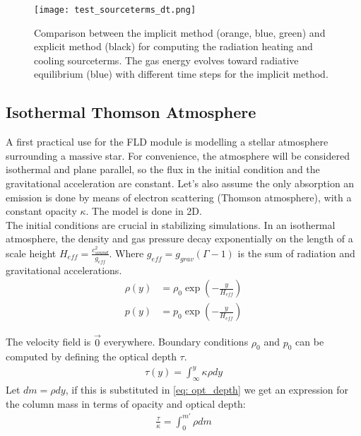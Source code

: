 \begin{figure}
\texttt{[image: test\_sourceterms\_dt.png]}
\label{fig: test_sourceterms}
\caption{Comparison between the implicit method (orange, blue, green) and explicit method (black) for computing the radiation heating and cooling sourceterms. The gas energy evolves toward radiative equilibrium (blue) with different time steps for the implicit method.}
\end{figure}

\subsection{Isothermal Thomson Atmosphere} \label{section: IsoAtm}
A first practical use for the FLD module is modelling a stellar atmosphere surrounding a massive star. For convenience, the atmosphere will be considered isothermal and plane parallel, so the flux in the initial condition and the gravitational acceleration are constant. Let's also assume the only absorption an emission is done by means of electron scattering (Thomson atmosphere), with a constant opacity $\kappa$. The model is done in 2D.\\

The initial conditions are crucial in stabilizing simulations. In an isothermal atmosphere, the density and gas pressure decay exponentially on the length of a scale height $H_{eff} = \frac{c_{sound}^2}{g_{eff}}$. Where $g_{eff} = g_{grav}(\Gamma - 1)$ is the sum of radiation and gravitational accelerations. 
\begin{align}
\rho(y) &= \rho_0 \exp \left( -\frac{y}{H_{eff}} \right) \\
 p(y)   &= p_0    \exp \left( -\frac{y}{H_{eff}} \right)
\end{align}

The velocity field is $\vec{0}$ everywhere. Boundary conditions $\rho_0$ and $p_0$ can be computed by defining the optical depth $\tau$. 
\begin{align}
\tau(y) = \int_\infty^{y} \kappa \rho dy  \label{eq: opt_depth}
\end{align}
Let $dm = \rho dy$, if this is substituted in \eqref{eq: opt_depth} we get an expression for the column mass in terms of opacity and optical depth:
\begin{align}
\frac{\tau}{\kappa} = \int_0^{m'} \rho dm
\end{align}


